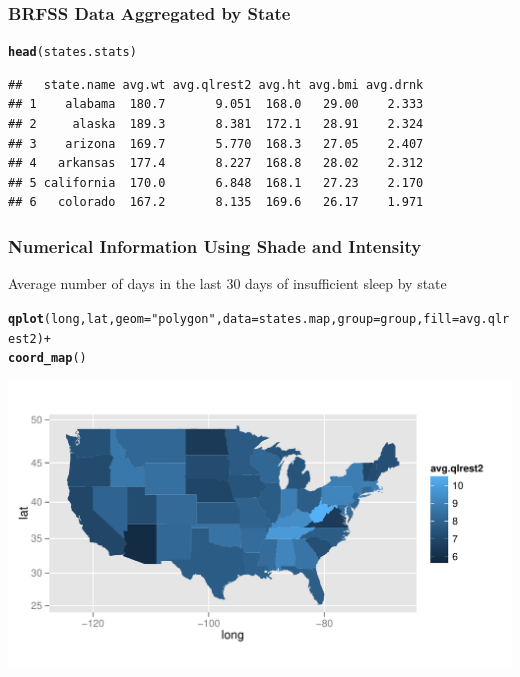 \documentclass{beamer}\usepackage[]{graphicx}\usepackage[]{color}
\makeatletter
\newcommand{\hlstr}[1]{\textcolor[rgb]{0.192,0.494,0.8}{#1}}%
\newcommand{\hlopt}[1]{\textcolor[rgb]{0,0,0}{#1}}%
\newcommand{\hlstd}[1]{\textcolor[rgb]{0.345,0.345,0.345}{#1}}%
\newcommand{\hlkwc}[1]{\textcolor[rgb]{0.333,0.667,0.333}{#1}}%
\newcommand{\hlkwd}[1]{\textcolor[rgb]{0.737,0.353,0.396}{\textbf{#1}}}%
\newenvironment{kframe}{%
 \def\at@end@of@kframe{}%
 \ifinner\ifhmode%
  \def\at@end@of@kframe{\end{minipage}}%
  \begin{minipage}{\columnwidth}%
 \fi\fi%
 \def\FrameCommand##1{\hskip\@totalleftmargin \hskip-\fboxsep
 \colorbox{shadecolor}{##1}\hskip-\fboxsep
     \hskip-\linewidth \hskip-\@totalleftmargin \hskip\columnwidth}%
 \MakeFramed {\advance\hsize-\width
   \@totalleftmargin\z@ \linewidth\hsize
   \@setminipage}}%
 {\par\unskip\endMakeFramed%
 \at@end@of@kframe}
\newenvironment{knitrout}{}{} %
\makeatother
\begin{document}

\begin{frame}[fragile]
    \frametitle{BRFSS Data Aggregated by State}
    
    
    \small
\begin{knitrout}\footnotesize
{}\color{fgcolor}\begin{kframe}
\begin{alltt}
\hlkwd{head}\hlstd{(states.stats)}
\end{alltt}
\begin{verbatim}
##   state.name avg.wt avg.qlrest2 avg.ht avg.bmi avg.drnk
## 1    alabama  180.7       9.051  168.0   29.00    2.333
## 2     alaska  189.3       8.381  172.1   28.91    2.324
## 3    arizona  169.7       5.770  168.3   27.05    2.407
## 4   arkansas  177.4       8.227  168.8   28.02    2.312
## 5 california  170.0       6.848  168.1   27.23    2.170
## 6   colorado  167.2       8.135  169.6   26.17    1.971
\end{verbatim}
\end{kframe}
\end{knitrout}

    \normalsize
\end{frame}


\begin{frame}[fragile]
    \frametitle{Numerical Information Using Shade and Intensity}

Average number of days in the last 30 days of insufficient sleep by state

\small
\begin{knitrout}\footnotesize
{}\color{fgcolor}\begin{kframe}
\begin{alltt}
\hlkwd{qplot}\hlstd{(long, lat,} \hlkwc{geom} \hlstd{=} \hlstr{"polygon"}\hlstd{,} \hlkwc{data} \hlstd{= states.map,} \hlkwc{group} \hlstd{= group,} \hlkwc{fill} \hlstd{= avg.qlrest2)} \hlopt{+}
    \hlkwd{coord_map}\hlstd{()}
\end{alltt}
\end{kframe}
\includegraphics[width=\textwidth]{figure/ksleepdep} 

\end{knitrout}

    \normalsize
\end{frame}
\end{document}

